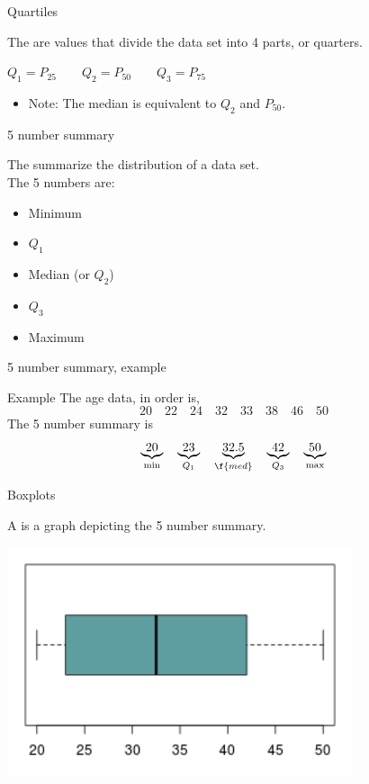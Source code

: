 \documentclass[xcolor=table, handout]{beamer}
\begin{document}
\begin{frame}{Quartiles}
\begin{block}{}
\large
The  are values that divide the data set into 4 parts, or quarters.\\
\smallskip
{\centering
$Q_1 = P_{25} \qquad Q_2 = P_{50} \qquad Q_3 = P_{75}$
\par}
\begin{itemize}
\pause
\item Note: The median is equivalent to $Q_2$ and $P_{50}$.
\end{itemize}
\end{block}
\end{frame}

\begin{frame}{5 number summary}
\begin{block}{}
\large 
The  summarize the distribution of a data set.\\
\medskip
The 5 numbers are:
\begin{itemize}
\item Minimum
\item $Q_1$
\item Median (or $Q_2$)
\item $Q_3$
\item Maximum
\end{itemize}
\end{block}
\end{frame}

\begin{frame}{5 number summary, example}
\begin{exampleblock}{Example}
The age data, in order is, 
\[20 \quad 22 \quad 24 \quad 32 \quad 33 \quad 38 \quad 46 \quad 50 \]
The 5 number summary is
\[\underbrace{20}_{\min} \quad \underbrace{23}_{Q_1} \quad \underbrace{32.5}_{\f{med}} \quad \underbrace{42}_{Q_3} \quad \underbrace{50}_{\max}\]
\end{exampleblock}
\end{frame}

\begin{frame}{Boxplots}
\begin{block}{}
\large
A  is a graph depicting the 5 number summary.
\end{block}
{\centering
\includegraphics[width=4in]{../images/ch03_boxplot}\par
}
\end{frame}
\end{document}
